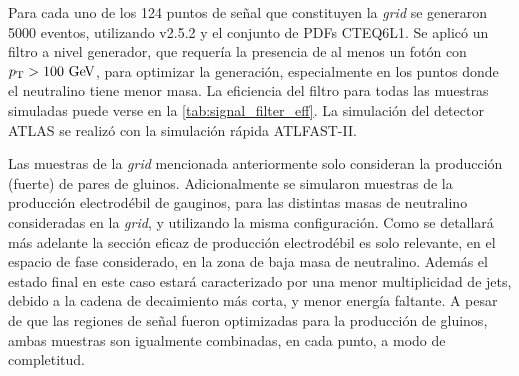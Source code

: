 Para cada uno de los 124 puntos de señal que constituyen la \emph{grid} se generaron
5000 eventos, utilizando {\herwigpp} v2.5.2\cite{Bahr:2008pv} y el conjunto de
PDFs CTEQ6L1\cite{Nadolsky:2008zw}. Se aplicó un filtro a nivel generador, que
requería la presencia de al menos un fotón con $\pt > 100 \gev$, para
optimizar la generación, especialmente en los puntos donde el
neutralino tiene menor masa. La eficiencia del filtro para todas las muestras
simuladas puede verse en la \cref{tab:signal_filter_eff}. La simulación del
detector ATLAS se realizó con la simulación rápida
\textsc{ATLFAST-II}\cite{Richter-Was:683751}.

Las muestras de la \emph{grid} mencionada anteriormente solo consideran la
producción (fuerte) de pares de gluinos. Adicionalmente se simularon muestras
de la producción electrodébil de gauginos, para las distintas masas de
neutralino consideradas en la \emph{grid}, y utilizando la misma
configuración. Como se detallará más adelante la sección eficaz de producción
electrodébil es solo relevante, en el espacio de fase considerado, en la zona
de baja masa de neutralino. Además el estado final en este caso estará
caracterizado por una menor multiplicidad de jets, debido a la cadena de
decaimiento más corta, y menor energía faltante. A pesar de que las regiones
de señal fueron optimizadas para la producción de gluinos, ambas muestras son
igualmente combinadas, en cada punto, a modo de completitud.


